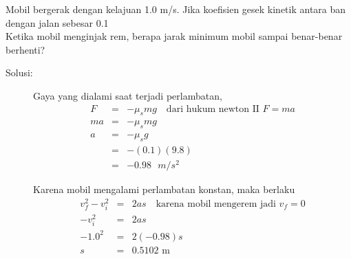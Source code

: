 \item
Mobil bergerak dengan kelajuan 1.0 m/s. Jika koefisien gesek kinetik antara ban dengan jalan sebesar 0.1\\
Ketika mobil menginjak rem, berapa jarak minimum mobil sampai benar-benar berhenti?
\begin{description}
    \item[Solusi:]
Gaya yang dialami saat terjadi perlambatan,
\begin{eqnarray*}
F&=&-\mu_{s}mg \quad \mbox{dari hukum newton II $F=ma$} \\
ma&=&-\mu_{s}mg \\
a&=&-\mu_{s}g \\
&=&-(0.1)(9.8) \\
&=&-0.98 \textrm{ $m/s^2$}
\end{eqnarray*}

Karena mobil mengalami perlambatan konstan, maka berlaku
\begin{eqnarray*}
v_{f}^{2}-v_{i}^{2}&=&2as  \quad \mbox{karena mobil mengerem jadi $v_{f}=0$} \\
-v_{i}^{2}&=&2as \\
-1.0^2&=&2(-0.98)s \\
s&=&0.5102 \textrm{ m}
\end{eqnarray*}
\end{description}

